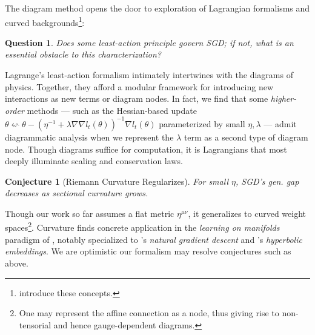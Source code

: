 \documentclass{article}
\theoremstyle{plain}
\newtheorem{conj}{Conjecture}
\newtheorem{quest}{Question}
\theoremstyle{definition}
\begin{document}
        The diagram method opens the door to exploration of Lagrangian
        formalisms and curved backgrounds\footnote{
            \cite{la60, la51} introduce these concepts.
        }:
        \begin{quest}
            Does some least-action principle govern SGD; if not, what is an
            essential obstacle to this characterization?
        \end{quest}
        Lagrange's least-action formalism intimately intertwines with the
        diagrams of physics.  Together, they afford a modular framework for
        introducing new interactions as new terms or diagram nodes.  In fact,
        we find that some \emph{higher-order} methods --- such as the
        Hessian-based update
        $
            \theta \leftsquigarrow
            \theta -
            (\eta^{-1} + \lambda \nabla \nabla l_t(\theta))^{-1}
            \nabla l_t(\theta)
        $
        parameterized by small $\eta, \lambda$ --- admit diagrammatic analysis
        when we represent the $\lambda$ term as a second type of diagram node.
        Though diagrams suffice for computation, it is Lagrangians that most
        deeply illuminate scaling and conservation laws.
        \begin{conj}[Riemann Curvature Regularizes]
            For small $\eta$, SGD's gen. gap decreases as sectional curvature
            grows.
        \end{conj}
        Though our work so far assumes a flat metric $\eta^{\mu\nu}$, it
        generalizes to curved weight spaces\footnote{
            One may represent the affine connection as a node, thus giving
            rise to non-tensorial and hence gauge-dependent diagrams.
        }.
        Curvature finds concrete application in the \emph{learning on
        manifolds} paradigm of \cite{ab07, zh16}, notably specialized to
        \cite{am98}'s \emph{natural gradient descent} and \cite{ni17}'s
        \emph{hyperbolic embeddings}.  We are optimistic our formalism may
        resolve conjectures such as above.



\end{document}
